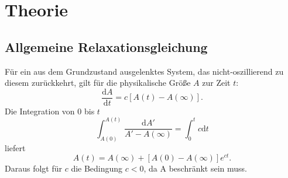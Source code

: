 
\section{Theorie}
\label{sec:Theorie}
\subsection{Allgemeine Relaxationsgleichung}
Für ein aus dem Grundzustand ausgelenktes System, das nicht-oszillierend zu diesem zurückkehrt, gilt für die physikalische Größe $A$ zur Zeit $t$:
\begin{equation}
\frac{\mathrm{d}A}{\mathrm{d}t}=c\left[A(t)-A(\infty)\right]\text{.}
\end{equation}
Die Integration von $0$ bis $t$
\[
\int_{A(0)}^{A(t)} \frac{\mathrm{d}A'}{A' - A(\infty)}=\int_0^tc\mathrm{d}t
\]
liefert 
\begin{equation}
A(t) = A(\infty) + \left[A(0)-A(\infty)\right]e^{ct}\text{.}
\end{equation}
Daraus folgt für $c$ die Bedingung $c<0$, da A beschränkt sein muss.
